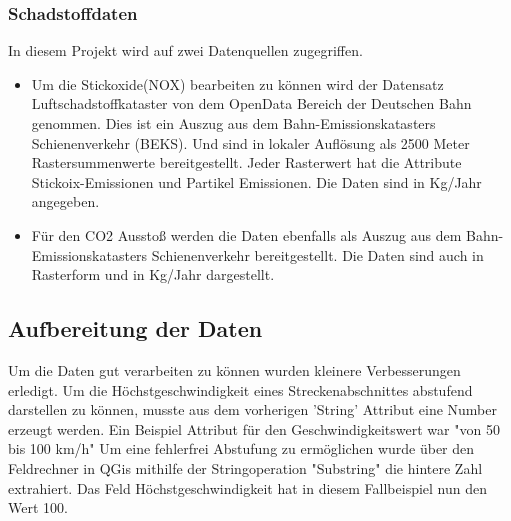 \subsubsection{Schadstoffdaten}
In diesem Projekt wird auf zwei Datenquellen zugegriffen. 
\begin{itemize}
	\item Um die Stickoxide(NOX) bearbeiten zu können wird der Datensatz Luftschadstoffkataster von dem OpenData Bereich der Deutschen Bahn genommen.
Dies ist ein Auszug aus dem Bahn-Emissionskatasters Schienenverkehr (BEKS). \cite{Luftschadstoffkataster}Und sind in lokaler Auflösung als 2500 Meter Rastersummenwerte bereitgestellt.
Jeder Rasterwert hat die Attribute Stickoix-Emissionen und Partikel Emissionen. Die Daten sind in Kg/Jahr angegeben. 

\item Für den CO2 Ausstoß werden die Daten ebenfalls als Auszug aus dem Bahn-Emissionskatasters Schienenverkehr bereitgestellt. Die Daten sind auch in Rasterform und in Kg/Jahr dargestellt.

\end{itemize}
\subsection{Aufbereitung der Daten}

Um die Daten gut verarbeiten zu können wurden kleinere Verbesserungen erledigt. Um die Höchstgeschwindigkeit eines Streckenabschnittes abstufend darstellen zu können, musste aus dem vorherigen 'String' Attribut eine Number erzeugt werden.
Ein Beispiel Attribut für den Geschwindigkeitswert war "von 50 bis 100 km/h"
Um eine fehlerfrei Abstufung zu ermöglichen wurde über den Feldrechner in QGis mithilfe der Stringoperation "Substring" die hintere Zahl extrahiert.
Das Feld Höchstgeschwindigkeit hat in diesem Fallbeispiel nun den Wert 100.

